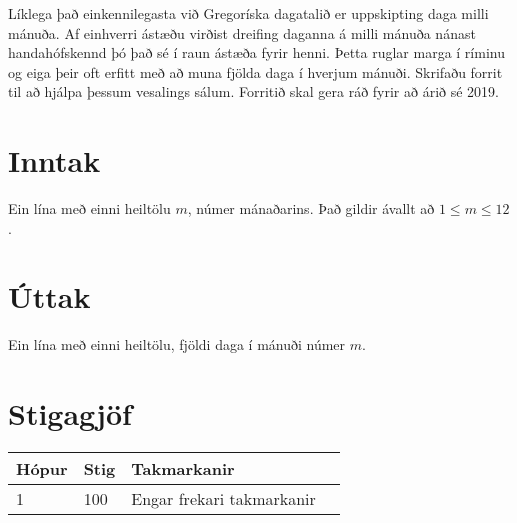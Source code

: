 Líklega það einkennilegasta við Gregoríska dagatalið er uppskipting daga milli mánuða.
Af einhverri ástæðu virðist dreifing daganna á milli mánuða nánast handahófskennd þó það sé í raun ástæða fyrir henni.
Þetta ruglar marga í ríminu og eiga þeir oft erfitt með að muna fjölda daga í hverjum mánuði.
Skrifaðu forrit til að hjálpa þessum vesalings sálum. Forritið skal gera ráð fyrir að árið sé 2019.

\section*{Inntak}
Ein lína með einni heiltölu $m$, númer mánaðarins. Það gildir ávallt að $1 \leq m \leq 12$.

\section*{Úttak}
Ein lína með einni heiltölu, fjöldi daga í mánuði númer $m$.

\section*{Stigagjöf}
\begin{tabular}{|l|l|l|l|}
\hline
Hópur & Stig & Takmarkanir \\ \hline
1     & 100  & Engar frekari takmarkanir \\ \hline
\end{tabular}

